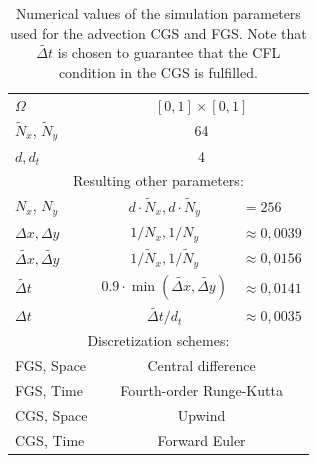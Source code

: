 \begin{table}[!ht]
\caption{Numerical values of the simulation parameters used for the advection CGS and FGS. Note that $\widetilde{\Delta t}$ is chosen to guarantee that the CFL condition in the CGS is fulfilled.}
\vskip 0.15in
\centering
\begin{tabular}{@{}l|c|l@{}}
\toprule
$\Omega$ & \multicolumn{2}{c}{$[0, 1] \times [0, 1]$} \\ 
$\tilde N_x$, $\tilde N_y$ & \multicolumn{2}{c}{64}  \\ 
$d, d_t$ &  \multicolumn{2}{c}{4}\\ 
\bottomrule
\multicolumn{3}{c}{Resulting other parameters:}  \\
\toprule
$ N_x$, $ N_y$ &   $d\cdot\tilde N_x,d\cdot \tilde N_y$ & $=256$ \\ 
$\Delta x, \Delta y$ &  $1/N_{x},1/N_y$ & $\approx 0,0039$  \\ 
$\widetilde{\Delta x}, \widetilde{\Delta y}$ &  $1/{\tilde N_{x}}, 1/{\tilde N_y}$ & $\approx 0,0156$   \\
$\widetilde{\Delta t}$ &  $0.9 \cdot \min(\widetilde{\Delta x}, \widetilde{\Delta y})$& $ \approx 0,0141$  \\
${\Delta t}$ &  $\widetilde{\Delta t}/{d_t}$  & $ \approx 0,0035$  \\ 
\bottomrule
\multicolumn{3}{c}{Discretization schemes:}  \\
\toprule
FGS, Space & \multicolumn{2}{c}{Central difference} \\
FGS, Time & \multicolumn{2}{c}{Fourth-order Runge-Kutta} \\
CGS, Space & \multicolumn{2}{c}{Upwind} \\
CGS, Time & \multicolumn{2}{c}{Forward Euler} \\
\bottomrule
\end{tabular}
\label{tab:advection_params}
\end{table}

